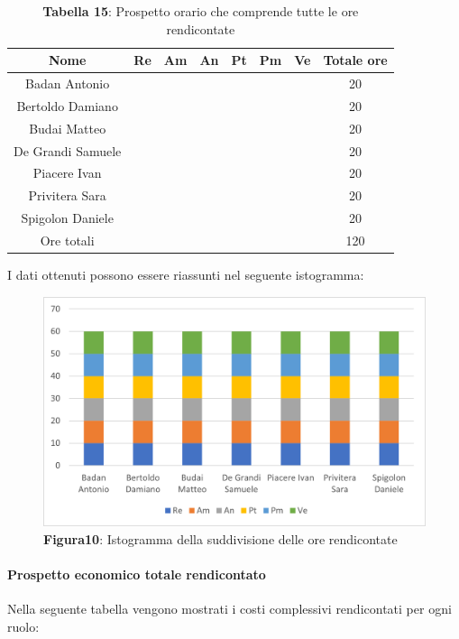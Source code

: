 \begin{table}[H]
	\centering
	\renewcommand{\arraystretch}{1.5}
	\begin{tabular}{|c|c|c|c|c|c|c|c|}
		\hline
		\rowcolor{lighter-grayer}
		Nome & Re & Am & An & Pt & Pm & Ve & Totale ore\\
		\hline
		Badan Antonio &  &  &  &  &  &  & 20 \\
		\hline
		Bertoldo Damiano&  &  &  &  &  &  & 20 \\
		\hline
		Budai Matteo&  &  &  &  &  &  & 20 \\
		\hline
		De Grandi Samuele&  &  &  &  &  &  & 20 \\
		\hline
		Piacere Ivan&  &  &  &  &  &  & 20 \\
		\hline
		Privitera Sara&  &  &  &  &  &  & 20 \\
		\hline
		Spigolon Daniele&  &  &  &  &  &  & 20 \\
		\hline
		Ore totali&  &  &  &  &  &  & 120 \\
		\hline
	\end{tabular}
	\caption*{\textbf{Tabella 15}: Prospetto orario che comprende tutte le ore rendicontate\\}
\end{table}	
I dati ottenuti possono essere riassunti nel seguente istogramma:

\begin{figure}[H]
	\centering
	\includegraphics[width=0.7\linewidth]{res/images/Figura10.png}
	\caption*{\textbf{Figura10}: Istogramma della suddivisione delle ore rendicontate}
	\label{fig:Figura10}
\end{figure}

\paragraph{Prospetto economico totale rendicontato}
Nella seguente tabella vengono mostrati i costi complessivi rendicontati per ogni ruolo:

